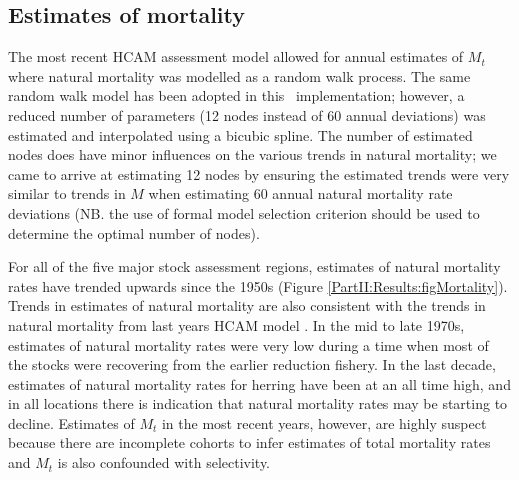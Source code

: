 \subsection{Estimates of mortality}

The most recent HCAM assessment model allowed for annual estimates of $M_t$ where natural mortality was modelled as a random walk process.  The same random walk model has been adopted in this \iscam\ implementation; however, a reduced number of parameters (12 nodes instead of 60 annual deviations) was estimated and interpolated using a bicubic spline.  The number of estimated nodes does have minor influences on the various trends in natural mortality; we came to arrive at estimating 12 nodes by ensuring the estimated trends were very similar to trends in $M$ when estimating 60 annual natural mortality rate deviations (NB. the use of formal model selection criterion should be used to determine the optimal number of nodes).

For all of the five major stock assessment regions, estimates of natural mortality rates have trended upwards since the 1950s (Figure \ref{PartII:Results:figMortality}).  Trends in estimates of natural mortality are also consistent with the trends in natural mortality from last years HCAM model  \citep[see Figure 18 in][]{Clear2010}.  In the mid to late 1970s, estimates of natural mortality rates were very low during a time when most of the stocks were recovering from the earlier reduction fishery.  In the last decade, estimates of natural mortality rates for herring have been at an all time high, and in all locations there is indication that natural mortality rates may be starting to decline. Estimates of $M_t$ in the most recent years, however,  are highly suspect because there are incomplete cohorts to infer estimates of total mortality rates and $M_t$ is also confounded with selectivity.



